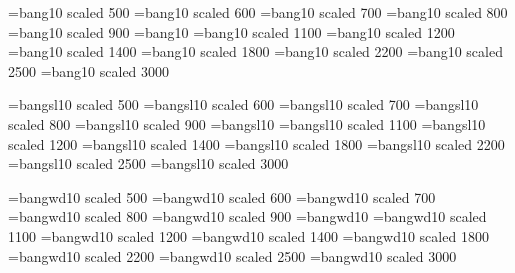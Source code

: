 \font\bngv=bang10 scaled 500
\font\bngvi=bang10 scaled 600
\font\bngvii=bang10 scaled 700
\font\bngviii=bang10 scaled 800
\font\bngix=bang10 scaled 900
\font\bngx=bang10
\font\bngxi=bang10 scaled 1100
\font\bngxii=bang10 scaled 1200
\font\bngxiv=bang10 scaled 1400
\font\bngxviii=bang10 scaled 1800
\font\bngxxii=bang10 scaled 2200
\font\bngxxv=bang10 scaled 2500
\font\bngxxx=bang10 scaled 3000

\font\bnsv=bangsl10 scaled 500
\font\bnsvi=bangsl10 scaled 600
\font\bnsvii=bangsl10 scaled 700
\font\bnsviii=bangsl10 scaled 800
\font\bnsix=bangsl10 scaled 900
\font\bnsx=bangsl10
\font\bnsxi=bangsl10 scaled 1100
\font\bnsxii=bangsl10 scaled 1200
\font\bnsxiv=bangsl10 scaled 1400
\font\bnsxviii=bangsl10 scaled 1800
\font\bnsxxii=bangsl10 scaled 2200
\font\bnsxxv=bangsl10 scaled 2500
\font\bnsxxx=bangsl10 scaled 3000

\font\bnwv=bangwd10 scaled 500
\font\bnwvi=bangwd10 scaled 600
\font\bnwvii=bangwd10 scaled 700
\font\bnwviii=bangwd10 scaled 800
\font\bnwix=bangwd10 scaled 900
\font\bnwx=bangwd10
\font\bnwxi=bangwd10 scaled 1100
\font\bnwxii=bangwd10 scaled 1200
\font\bnwxiv=bangwd10 scaled 1400
\font\bnwxviii=bangwd10 scaled 1800
\font\bnwxxii=bangwd10 scaled 2200
\font\bnwxxv=bangwd10 scaled 2500
\font\bnwxxx=bangwd10 scaled 3000


